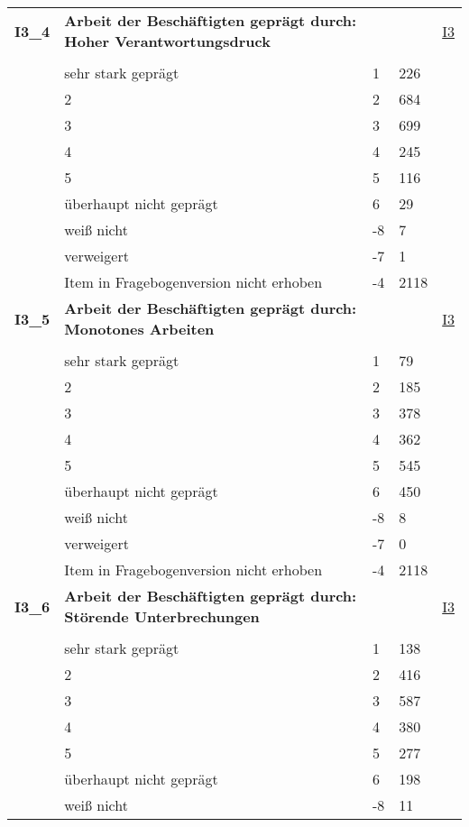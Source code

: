 \begin{longtable}{| L{2.5cm} | L{8.25cm}| C{1.5cm} | R{1.25cm} | C{2.25cm} |  }
   \midrule
\textbf{I3\_4}\label{var:suf:I3:4} & \textbf{Arbeit der Beschäftigten geprägt durch: Hoher Verantwortungsdruck} &  &  & \hyperref[I3]{I3} \\ 
   &  &  &  &  \\ 
   & sehr stark geprägt & 1 & 226 &  \\ 
   & 2 & 2 & 684 &  \\ 
   & 3 & 3 & 699 &  \\ 
   & 4 & 4 & 245 &  \\ 
   & 5 & 5 & 116 &  \\ 
   & überhaupt nicht geprägt & 6 & 29 &  \\ 
   & weiß nicht & -8 & 7 &  \\ 
   & verweigert & -7 & 1 &  \\ 
   & Item in Fragebogenversion nicht erhoben & -4 & 2118 &  \\ 
   \midrule
\textbf{I3\_5}\label{var:suf:I3:5} & \textbf{Arbeit der Beschäftigten geprägt durch: Monotones Arbeiten} &  &  & \hyperref[I3]{I3} \\ 
   &  &  &  &  \\ 
   & sehr stark geprägt & 1 & 79 &  \\ 
   & 2 & 2 & 185 &  \\ 
   & 3 & 3 & 378 &  \\ 
   & 4 & 4 & 362 &  \\ 
   & 5 & 5 & 545 &  \\ 
   & überhaupt nicht geprägt & 6 & 450 &  \\ 
   & weiß nicht & -8 & 8 &  \\ 
   & verweigert & -7 & 0 &  \\ 
   & Item in Fragebogenversion nicht erhoben & -4 & 2118 &  \\ 
   \midrule
\textbf{I3\_6}\label{var:suf:I3:6} & \textbf{Arbeit der Beschäftigten geprägt durch: Störende Unterbrechungen} &  &  & \hyperref[I3]{I3} \\ 
   &  &  &  &  \\ 
   & sehr stark geprägt & 1 & 138 &  \\ 
   & 2 & 2 & 416 &  \\ 
   & 3 & 3 & 587 &  \\ 
   & 4 & 4 & 380 &  \\ 
   & 5 & 5 & 277 &  \\ 
   & überhaupt nicht geprägt & 6 & 198 &  \\ 
   & weiß nicht & -8 & 11 &  \\ 

\end{longtable}
